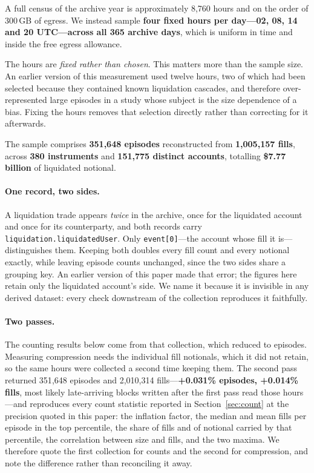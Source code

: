 \documentclass[11pt,a4paper]{article}
\begin{document}
A full census of the archive year is approximately 8{,}760 hours and on the order of 300\,GB of
egress. We instead sample \textbf{four fixed hours per day---02, 08, 14 and 20 UTC---across all
365 archive days}, which is uniform in time and inside the free egress allowance.

The hours are \emph{fixed rather than chosen}. This matters more than the sample size. An earlier
version of this measurement used twelve hours, two of which had been selected because they
contained known liquidation cascades, and therefore over-represented large episodes in a study
whose subject is the size dependence of a bias. Fixing the hours removes that selection directly
rather than correcting for it afterwards.

The sample comprises \textbf{351{,}648 episodes} reconstructed from \textbf{1{,}005{,}157 fills},
across \textbf{380 instruments} and \textbf{151{,}775 distinct accounts}, totalling
\textbf{\$7.77 billion} of liquidated notional.

\paragraph{One record, two sides.} A liquidation trade appears \emph{twice} in the archive,
once for the liquidated account and once for its counterparty, and both records carry
\texttt{liquidation.liquidatedUser}. Only \texttt{event[0]}---the account whose fill it
is---distinguishes them. Keeping both doubles every fill count and every notional exactly,
while leaving episode counts unchanged, since the two sides share a grouping key. An earlier
version of this paper made that error; the figures here retain only the liquidated account's
side. We name it because it is invisible in any derived dataset: every check downstream of the
collection reproduces it faithfully.

\paragraph{Two passes.} The counting results below come from that collection, which reduced to
episodes. Measuring compression needs the individual fill notionals, which it did not retain, so
the same hours were collected a second time keeping them. The second pass returned 351{,}648
episodes and 2{,}010{,}314 fills---\textbf{+0.031\% episodes, +0.014\% fills}, most likely
late-arriving blocks written after the first pass read those hours---and reproduces every count
statistic reported in Section~\ref{sec:count} at the precision quoted in this paper: the
inflation factor, the median and mean fills per episode in the top percentile, the share of
fills and of notional carried by that percentile, the correlation between size and fills, and
the two maxima. We
therefore quote the first collection for counts and the second for compression, and note the
difference rather than reconciling it away.
\end{document}
